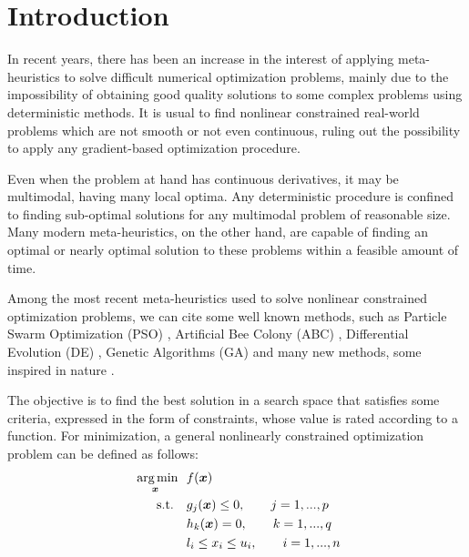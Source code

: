 \section{Introduction} \label{sec:Introduction}

In recent years, there has been an increase in the interest of applying meta-heuristics to solve difficult numerical optimization problems, mainly due to the impossibility of obtaining good quality solutions to some complex problems using deterministic methods. It is usual to find nonlinear constrained real-world problems which are not smooth or not even continuous, ruling out the possibility to apply any gradient-based optimization procedure.

Even when the problem at hand has continuous derivatives, it may be multimodal, having many local optima. Any deterministic procedure is confined to finding sub-optimal solutions for any multimodal problem of reasonable size. Many modern meta-heuristics, on the other hand, are capable of finding an optimal or nearly optimal solution to these problems within a feasible amount of time.

Among the most recent meta-heuristics used to solve nonlinear constrained optimization problems, we can cite some well known methods, such as Particle Swarm Optimization (PSO) \citep{IPSO, IAPSO, PSO1}, Artificial Bee Colony (ABC) \citep{CB-ABC, IABC-Mal}, Differential Evolution (DE) \citep{DE1, DE2, MVDE}, Genetic Algorithms (GA) \citep{GA1} and many new methods, some inspired in nature \citep{CS, WCA, MBA}.

The objective is to find the best solution in a search space that satisfies some criteria, expressed in the form of constraints, whose value is rated according to a function. For minimization, a general nonlinearly constrained optimization problem can be defined as follows: \\[-3em]

\begin{equation}\label{eq:func}
    \begin{aligned}
    \underset{\bm{x}}{\text{\fnt{10} arg\,min}} \ \ & f(\bm{x}) \\
    \text{s.t.} \quad & g_j(\bm{x}) \leq 0, \qquad j = 1, ..., p  \\
                      & h_k(\bm{x}) = 0, \qquad k = 1, ..., q  \\
                      & l_i \leq x_i \leq u_i, \qquad i = 1, ..., n 
    \end{aligned}
\end{equation}


